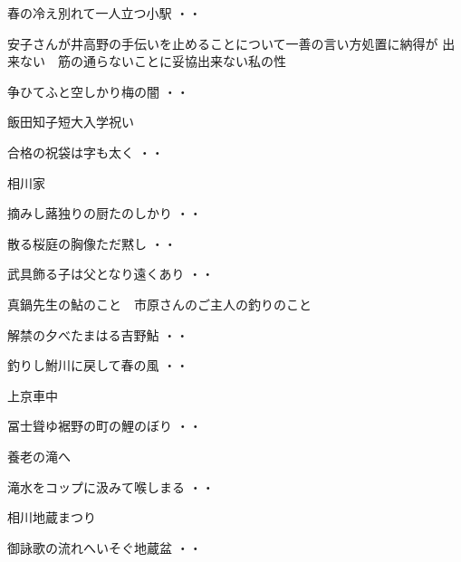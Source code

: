 \begin{shiika}春の冷え別れて一人立つ小駅
\hfill{・・}\end{shiika}
\vspace{0.6cm}
安子さんが井高野の手伝いを止めることについて一善の言い方処置に納得が
出来ない　筋の通らないことに妥協出来ない私の性
\begin{shiika}争ひてふと空しかり梅の闇
\hfill{・・}\end{shiika}
\vspace{0.6cm}
飯田知子短大入学祝い
\begin{shiika}合格の祝袋は字も太く
\hfill{・・}\end{shiika}
\vspace{0.6cm}
相川家
\begin{shiika}摘みし蕗独りの厨たのしかり
\hfill{・・}\end{shiika}
\vspace{0.6cm}
\begin{shiika}散る桜庭の胸像ただ黙し
\hfill{・・}\end{shiika}
\vspace{0.6cm}
\begin{shiika}武具飾る子は父となり遠くあり
\hfill{・・}\end{shiika}
\vspace{0.6cm}
真鍋先生の鮎のこと　市原さんのご主人の釣りのこと
\begin{shiika}解禁の夕べたまはる吉野鮎
\hfill{・・}\end{shiika}
\begin{shiika}釣りし鮒川に戻して春の風
\hfill{・・}\end{shiika}
\vspace{0.6cm}
上京車中
\begin{shiika}冨士聳ゆ裾野の町の鯉のぼり
\hfill{・・}\end{shiika}
\vspace{0.6cm}
養老の滝へ
\begin{shiika}滝水をコップに汲みて喉しまる
\hfill{・・}\end{shiika}
\vspace{0.6cm}
相川地蔵まつり
\begin{shiika}御詠歌の流れへいそぐ地蔵盆
\hfill{・・}\end{shiika}
